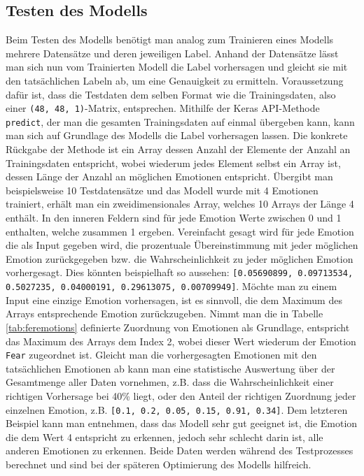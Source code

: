 \documentclass[12pt, a4paper]{scrbook}
\begin{document}
\subsection{Testen des Modells}
Beim Testen des Modells benötigt man analog zum Trainieren eines Modells mehrere Datensätze und deren jeweiligen Label. Anhand der Datensätze lässt man sich nun vom Trainierten Modell die Label vorhersagen und gleicht sie mit den tatsächlichen Labeln ab, um eine Genauigkeit zu ermitteln. Voraussetzung dafür ist, dass die Testdaten dem selben Format wie die Trainingsdaten, also einer \texttt{(48, 48, 1)}-Matrix, entsprechen. Mithilfe der Keras API-Methode \texttt{predict}, der man die gesamten Trainingsdaten auf einmal übergeben kann, kann man sich auf Grundlage des Modells die Label vorhersagen lassen. Die konkrete Rückgabe der Methode ist ein Array dessen Anzahl der Elemente der Anzahl an Trainingsdaten entspricht, wobei wiederum jedes Element selbst ein Array ist, dessen Länge der Anzahl an möglichen Emotionen entspricht. Übergibt man beispielsweise 10 Testdatensätze und das Modell wurde mit 4 Emotionen trainiert, erhält man ein zweidimensionales Array, welches 10 Arrays der Länge 4 enthält. In den inneren Feldern sind für jede Emotion Werte zwischen 0 und 1 enthalten, welche zusammen 1 ergeben. Vereinfacht gesagt wird für jede Emotion die als Input gegeben wird, die prozentuale Übereinstimmung mit jeder möglichen Emotion zurückgegeben bzw. die Wahrscheinlichkeit zu jeder möglichen Emotion vorhergesagt. Dies könnten beispielhaft so aussehen: \texttt{[0.05690899, 0.09713534, 0.5027235,  0.04000191, 0.29613075, 0.00709949]}. Möchte man zu einem Input eine einzige Emotion vorhersagen, ist es sinnvoll, die dem Maximum des Arrays entsprechende Emotion zurückzugeben. Nimmt man die in Tabelle \ref{tab:feremotions} definierte Zuordnung von Emotionen als Grundlage, entspricht das Maximum des Arrays dem Index 2, wobei dieser Wert wiederum der Emotion \texttt{Fear} zugeordnet ist.\newline
Gleicht man die vorhergesagten Emotionen mit den tatsächlichen Emotionen ab kann man eine statistische Auswertung über der Gesamtmenge aller Daten vornehmen, z.B. dass die Wahrscheinlichkeit einer richtigen Vorhersage bei 40\% liegt, oder den Anteil der richtigen Zuordnung jeder einzelnen Emotion, z.B. \texttt{[0.1, 0.2, 0.05, 0.15, 0.91, 0.34]}. Dem letzteren Beispiel kann man entnehmen, dass das Modell sehr gut geeignet ist, die Emotion die dem Wert 4 entspricht zu erkennen, jedoch sehr schlecht darin ist, alle anderen Emotionen zu erkennen. Beide Daten werden während des Testprozesses berechnet und sind bei der späteren Optimierung des Modells hilfreich.
\end{document}
